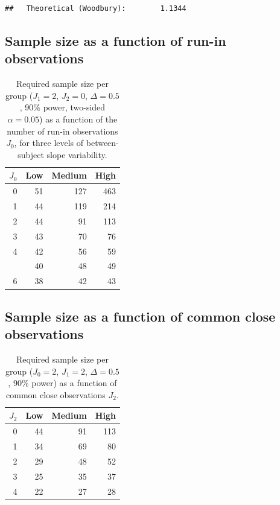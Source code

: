 \documentclass[
  11pt,
]{article}
\begin{document}
\begin{verbatim}
##   Theoretical (Woodbury):        1.1344
\end{verbatim}

\subsection{Sample size as a function of run-in observations}\label{sample-size-as-a-function-of-run-in-observations}

\begin{table}

\caption{\label{tab:table-runin}Required sample size per group ($J_1=2$, $J_2=0$, $\Delta=0.5$, 90\% power, two-sided $\alpha=0.05$) as a function of the number of run-in observations $J_0$, for three levels of between-subject slope variability.}
\centering
\begin{tabular}[t]{rrrr}
\toprule
$J_0$ & Low & Medium & High\\
\midrule
0 & 51 & 127 & 463\\
1 & 44 & 119 & 214\\
2 & 44 & 91 & 113\\
3 & 43 & 70 & 76\\
4 & 42 & 56 & 59\\
\addlinespace
5 & 40 & 48 & 49\\
6 & 38 & 42 & 43\\
\bottomrule
\end{tabular}
\end{table}

\subsection{Sample size as a function of common close observations}\label{sample-size-as-a-function-of-common-close-observations}

\begin{table}

\caption{\label{tab:table-close}Required sample size per group ($J_0=2$, $J_1=2$, $\Delta=0.5$, 90\% power) as a function of common close observations $J_2$.}
\centering
\begin{tabular}[t]{rrrr}
\toprule
$J_2$ & Low & Medium & High\\
\midrule
0 & 44 & 91 & 113\\
1 & 34 & 69 & 80\\
2 & 29 & 48 & 52\\
3 & 25 & 35 & 37\\
4 & 22 & 27 & 28\\
\bottomrule
\end{tabular}
\end{table}
\end{document}
